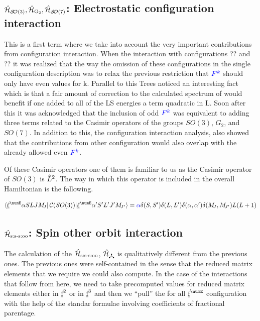\documentclass{article}
\begin{document}
\subsection{$\hat{\mathcal{H}}_{\mathcal{S\!O}(3)}, \hat{\mathcal{H}}_{\text{G}_2}, \hat{\mathcal{H}}_{\mathcal{S\!O}(7)}$: Electrostatic configuration interaction}

This is a first term where we take into account the very important contributions from configuration interaction. When the interaction with configurations ?? and ?? it was realized that the way the omission of these configurations in the single configuration description was to relax the previous restriction that $\textcolor{blue}{{F^k}}$ should only have even values for k. Parallel to this Trees noticed an interesting fact which is that a fair amount of correction to the calculated spectrum of would benefit if one added to all of the LS energies a term quadratic in L. Soon after this it was acknowledged that the inclusion of odd $\textcolor{blue}{{F^k}}$ was equivalent to adding three terms related to the Casimir operators of the groups $SO(3)$, $G_2$, and $SO(7)$. In addition to this, the configuration interaction analysis, also showed that the contributions from other configuration would also overlap with the already allowed even $\textcolor{blue}{{F^k}}$.

Of these Casimir operators one of them is familiar to us as the Casimir operator of $SO(3)$ is $\hat{L}^2$. The way in which this operator is included in the overall Hamiltonian is the following.

\begin{equation}
\braopket{\lorb^\numE \alpha S L J \Msub{J}}{\casimir{SO(3)}}{\lorb^\numE \alpha' S' L' J' \Msub{J'}} = \casimirAlpha \kronecker{S}{S'}\kronecker{L}{L'}\kronecker{\alpha}{\alpha'}\kronecker{\Msub{J}}{\Msub{J'}} L(L+1)
\end{equation}

\subsection{$\hat{\mathcal{H}}_{\text{s:s-s:oo}}$: Spin other orbit interaction}

The calculation of the $\hat{\mathcal{H}}_{\text{s:s-s:oo}}$, $\ham_{\trispoke}$ is qualitatively different from the previous ones. The previous ones were self-contained in the sense that the reduced matrix elements that we require we could also compute. In the case of the interactions that follow from here, we need to take precomputed values for reduced matrix elements either in $\underbar{$\text{f}$}^2$ or in $\underbar{$\text{f}$}^3$ and then we ``pull'' the for all $\forb^{\numE}$ configuration with the help of the standar formulae involving coefficients of fractional parentage.
\end{document}
